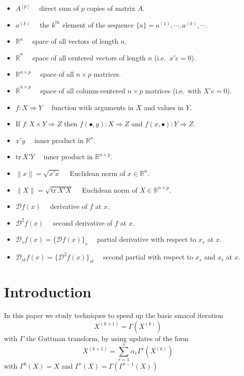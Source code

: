 \documentclass[
  12pt,
]{article}
\begin{document}
\begin{itemize}
\item
  \(A^{[p]}\quad\) direct sum of \(p\) copies of matrix \(A\).
\item
  \(a^{(k)}\quad\) the \(k^{th}\) element of the sequence \(\{a\}=a^{(1)},\cdots,a^{(k)},\cdots\).
\item
  \(\mathbb{R}^n\quad\) space of all vectors of length \(n\).
\item
  \(\overline{\mathbb{R}}^n\quad\) space of all centered vectors of length \(n\) (i.e.~\(x'e=0\)).
\item
  \(\mathbb{R}^{n\times p}\quad\) space of all \(n\times p\) matrices.
\item
  \(\overline{\mathbb{R}}^{n\times p}\quad\) space of all column-centered \(n\times p\) matrices (i.e.~with \(X'e=0\)).
\item
  \(f:X\Rightarrow Y\quad\) function with arguments in \(X\) and values in \(Y\).
\item
  If \(f:X\times Y\Rightarrow Z\) then \(f(\bullet,y):X\Rightarrow Z\)
  and \(f(x,\bullet):Y\Rightarrow Z\).
\item
  \(x'y\quad\) inner product in \(\mathbb{R}^n\).
\item
  \(\text{tr}\ X'Y\quad\) inner product in \(\mathbb{R}^{n\times p}\).
\item
  \(\|x\|=\sqrt{x'x}\quad\) Euclidean norm of \(x\in\mathbb{R}^n\).
\item
  \(\|X\|=\sqrt{\text{tr}\ X'X}\quad\) Euclidean norm of \(X\in\mathbb{R}^{n\times p}\).
\item
  \(\mathcal{D}f(x)\quad\) derivative of \(f\) at \(x\).
\item
  \(\mathcal{D}^2f(x)\quad\) second derivative of \(f\) at \(x\).
\item
  \(\mathcal{D}_sf(x)=\{\mathcal{D}f(x)\}_s\quad\) partial derivative with respect to \(x_s\) at \(x\).
\item
  \(\mathcal{D}_{st}f(x)=\{\mathcal{D}^2f(x)\}_{st}\quad\) second partial with respect to \(x_s\) and \(x_t\) at \(x\).
\end{itemize}

\section{Introduction}\label{introduction}

In this paper we study techniques to speed up the basic smacof iteration
\[
X^{(k+1)}=\Gamma(X^{(k)})
\]
with \(\Gamma\) the Guttman transform, by using updates of the form
\[
X^{(k+1)}=\sum_{r=1}^s\alpha_r\Gamma^r(X^{(k)})
\]
with \(\Gamma^0(X)=X\) and \(\Gamma^r(X)=\Gamma(\Gamma^{r-1}(X))\)
\end{document}

